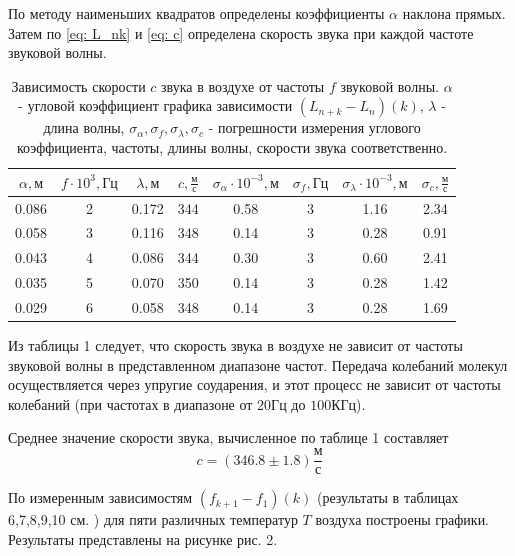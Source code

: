 По методу наименьших квадратов определены коэффициенты $\alpha$ наклона прямых. Затем по \eqref{eq: L_nk} и \eqref{eq: c} определена скорость звука при каждой частоте звуковой волны. 

\begin{table}[h]
    \centering
    \begin{tabular}{|c|c|c|c|c|c|c|c|}
    \hline
    $\alpha, \text{м}$ & $f\cdot 10^{3}, \text{Гц}$ & $\lambda, \text{м}$ & $c, \frac{\text{м}}{\text{с}}$ & $\sigma_\alpha \cdot 10^{-3}, \text{м}$ & $\sigma_f, \text{Гц}$ & $\sigma_\lambda \cdot 10^{-3}, \text{м}$ & $\sigma_c, \frac{\text{м}}{\text{с}}$ \\ \hline
    0.086   & 2 & 0.172 & 344 & 0.58 & 3 & 1.16 & 2.34\\ \hline
    0.058   & 3 & 0.116 & 348 & 0.14 & 3 & 0.28 & 0.91\\ \hline
    0.043   & 4 & 0.086 & 344 & 0.30 & 3 & 0.60 & 2.41\\ \hline
    0.035   & 5 & 0.070 & 350 & 0.14 & 3 & 0.28 & 1.42\\ \hline
    0.029   & 6 & 0.058 & 348 & 0.14 & 3 & 0.28 & 1.69\\ \hline
\end{tabular}
    \caption{Зависимость скорости $c$ звука в воздухе от частоты $f$ звуковой волны. $\alpha$ - угловой коэффициент графика зависимости $(L_{n+k} - L_n)(k)$, $\lambda$ - длина волны, $\sigma_\alpha, \sigma_f, \sigma_\lambda, \sigma_c$ - погрешности измерения углового коэффициента, частоты, длины волны, скорости звука соответственно.}
    \label{tab:t10}
\end{table}
\newpage
Из таблицы 1 следует, что скорость звука в воздухе не зависит от частоты звуковой волны в представленном диапазоне частот. Передача колебаний молекул осуществляется через упругие соударения, и этот процесс не зависит от частоты колебаний (при частотах в диапазоне от $20\text{Гц}$ до $100 \text{КГц}$).

Среднее значение скорости звука, вычисленное по таблице 1 составляет
\[ c = (346.8 \pm 1.8) \frac{\text{м}}{\text{с}}\]


По измеренным зависимостям $(f_{k+1} - f_1)(k)$ (результаты в таблицах 6,7,8,9,10 см. ) для пяти различных температур $T$ воздуха построены графики. Результаты представлены на рисунке рис. 2.

